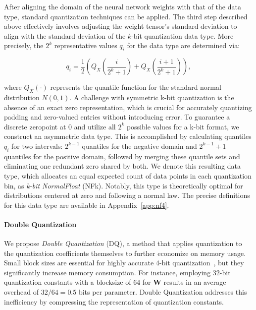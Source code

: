 After aligning the domain of the neural network weights with that of the data type, standard quantization techniques can be applied. The third step described above effectively involves adjusting the weight tensor’s standard deviation to align with the standard deviation of the $k$-bit quantization data type. More precisely, the $2^k$ representative values $q_i$ for the data type are determined via:

\begin{equation}
q_i  = \frac{1}{2}\left( Q_X\left(\frac{i}{2^k+1}\right) + Q_X\left(\frac{i+1}{2^k+1}\right)\right),
\end{equation}

where $Q_X(\cdot)$ represents the quantile function for the standard normal distribution $N(0,1)$. A challenge with symmetric k-bit quantization is the absence of an exact zero representation, which is crucial for accurately quantizing padding and zero-valued entries without introducing error. To guarantee a discrete zeropoint at $0$ and utilize all $2^k$ possible values for a k-bit format, we construct an asymmetric data type. This is accomplished by calculating quantiles $q_i$ for two intervals: $2^{k-1}$ quantiles for the negative domain and $2^{k-1}+1$ quantiles for the positive domain, followed by merging these quantile sets and eliminating one redundant zero shared by both. We denote this resulting data type, which allocates an equal expected count of data points in each quantization bin, as \emph{k-bit NormalFloat} (NFk). Notably, this type is theoretically optimal for distributions centered at zero and following a normal law. The precise definitions for this data type are available in Appendix~\ref{app:nf4}.

\paragraph{Double Quantization{}} 
We propose \emph{Double Quantization} (DQ), a method that applies quantization to the quantization coefficients themselves to further economize on memory usage. Small block sizes are essential for highly accurate 4-bit quantization~\citep{dettmers2022case}, but they significantly increase memory consumption. For instance, employing 32-bit quantization constants with a blocksize of 64 for $\mathbf{W}$ results in an average overhead of $32/64 = 0.5$ bits per parameter. Double Quantization addresses this inefficiency by compressing the representation of quantization constants.


